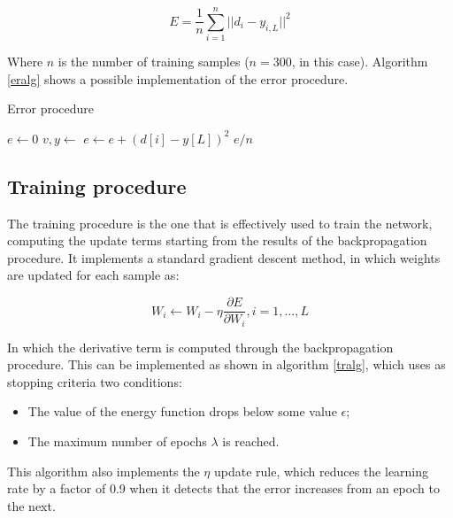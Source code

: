 \documentclass[letterpaper,headings=standardclasses]{scrartcl}
\begin{document}
$$ E = \frac{1}{n} \sum_{i = 1}^{n} || d_i - y_{i,L} ||^2 $$

Where $n$ is the number of training samples ($n = 300$, in this case). Algorithm \ref{eralg} shows a possible implementation of the error procedure.

\begin{algorithm}[h]
    \caption{Error procedure}
    \label{eralg}
    \begin{algorithmic}
    
        \State $e \gets 0$
            \State $v, y \gets $ 
            \State $e \gets e + (d[i] - y[L])^2$
        \EndFor
        \State \Return $e / n$
    \EndFunction
    
    \end{algorithmic}
\end{algorithm}

\subsection{Training procedure}

The training procedure is the one that is effectively used to train the network, computing the update terms starting from the results of the backpropagation procedure. It implements a standard gradient descent method, in which weights are updated for each sample as:

$$ W_i \leftarrow W_i - \eta \frac{\partial E}{\partial W_i}, i = 1, \dots, L $$

In which the derivative term is computed through the backpropagation procedure. This can be implemented as shown in algorithm \ref{tralg}, which uses as stopping criteria two conditions:

\begin{itemize}
    \item The value of the energy function drops below some value $\epsilon$;
    \item The maximum number of epochs $\lambda$ is reached.
\end{itemize}

This algorithm also implements the $\eta$ update rule, which reduces the learning rate by a factor of 0.9 when it detects that the error increases from an epoch to the next.
\end{document}
